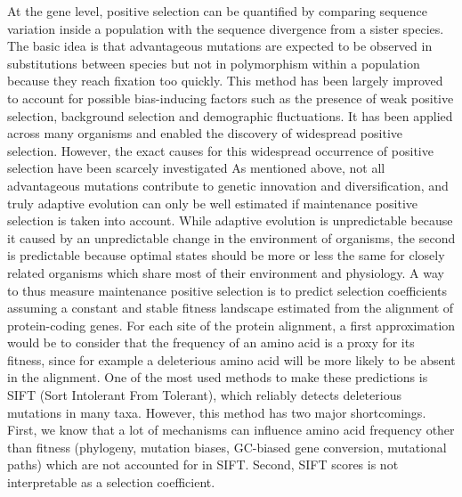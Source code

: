 \documentclass{article}
\newcommand{\NS}[1]{\textcolor{red}{\textbf{\emph{[NS: #1]}}}}
\begin{document}
    At the gene level, positive selection can be quantified by comparing sequence variation inside a population with the sequence divergence from a sister species\cite{mcdonald_adaptative_1991}.
    The basic idea is that advantageous mutations are expected to be observed in substitutions between species but not in polymorphism within a population because they reach fixation too quickly.
    This method has been largely improved to account for possible bias-inducing factors such as the presence of weak positive selection, background selection and demographic fluctuations\cite{eyre-walker_distribution_2006, eyre-walker_estimating_2009, galtier_adaptive_2016, tataru_inference_2017}.
    It has been applied across many organisms and enabled the discovery of widespread positive selection\cite{moutinho_variation_2019}.
    However, the exact causes for this widespread occurrence of positive selection have been scarcely investigated\cite{eyre-walker_distribution_2006, eyre-walker_estimating_2009, galtier_adaptive_2016} %
    As mentioned above, not all advantageous mutations contribute to genetic innovation and diversification, and truly adaptive evolution can only be well estimated if maintenance positive selection is taken into account.
    While adaptive evolution is unpredictable because it caused by an unpredictable change in the environment of organisms, the second is predictable because optimal states should be more or less the same for closely related organisms which share most of their environment and physiology.
    A way to thus measure maintenance positive selection is to predict selection coefficients assuming a constant and stable fitness landscape estimated from the alignment of protein-coding genes.
    For each site of the protein alignment, a first approximation would be to consider that the frequency of an amino acid is a proxy for its fitness, since for example a deleterious amino acid will be more likely to be absent in the alignment.
    One of the most used methods to make these predictions is SIFT (Sort Intolerant From Tolerant), which reliably detects deleterious mutations in many taxa\cite{ng_sift_2003, vaser_sift_2016}.
    However, this method has two major shortcomings.
    First, we know that a lot of mechanisms can influence amino acid frequency other than fitness (phylogeny, mutation biases, GC-biased gene conversion, mutational paths) which are not accounted for in SIFT\@.
    Second, SIFT scores is not interpretable as a selection coefficient.
\end{document}
